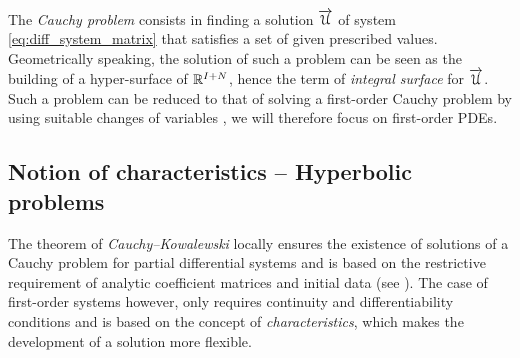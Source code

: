The \textit{Cauchy problem} consists in finding a solution ${\overrightarrow{\mathcal{U}}}$ of system \eqref{eq:diff_system_matrix} that satisfies a set of given prescribed values. Geometrically speaking, the solution of such a problem can be seen as the building of a hyper-surface of $\mathbb{R}^{I+N}$, hence the term of \textit{integral surface} for ${\overrightarrow{\mathcal{U}}}$. Such a problem can be reduced to that of solving a first-order Cauchy problem by using suitable changes of variables \cite[p.54]{PDEs}, we will therefore focus on first-order PDEs.

\subsection{Notion of characteristics -- Hyperbolic problems}
The theorem of \textit{Cauchy--Kowalewski} locally ensures the existence of solutions of a Cauchy problem for partial differential systems and is based on the restrictive requirement of analytic coefficient matrices and initial data (see \cite[p.46]{PDEs}). The case of first-order systems however, only requires continuity and differentiability conditions and is based on the concept of \textit{characteristics}, which makes the development of a solution more flexible.

